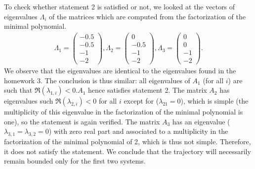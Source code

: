 \documentclass[11pt]{article}
\begin{document}
To check whether statement 2 is satisfied or not, we looked at the vectors of eigenvalues $\Lambda_i$ of the matrices which are computed from the factorization of the minimal polynomial.
\begin{align*}
    \Lambda_1 =\begin{pmatrix}
    -0.5\\
    -0.5\\
    -1\\
    -2
    \end{pmatrix},
    \Lambda_2 =\begin{pmatrix}
    0\\
    -0.5\\
    -1\\
    -2
    \end{pmatrix},
    \Lambda_3 =\begin{pmatrix}
    0\\
    0\\
    -1\\
    -2
    \end{pmatrix}.
\end{align*}
We observe that the eigenvalues are identical to the eigenvalues found in the homework 3. The conclusion is thus similar: all eigenvalues of $A_1$ (for all \(i\)) are such that $\Re(\lambda_{1, i})<0$.$A_1$ hence satisfies statement 2.
The matrix $A_2$ has eigenvalues such $\Re(\lambda_{2, i})<0$ for all \(i\) except for ($\lambda_{21}=0$), which is simple (the multiplicity of this eigenvalue in the factorization of the minimal polynomial is one), so the statement is again verified.
The matrix $A_3$ has an eigenvalue ($\lambda_{3, 1} = \lambda_{3, 2} = 0$) with zero real part and associated to a multiplicity in the factorization of the minimal polynomial of 2, which is thus not simple.
Therefore, it does not satisfy the statement. We conclude that the trajectory will necessarily remain bounded only for the first two systems.
\end{document}

